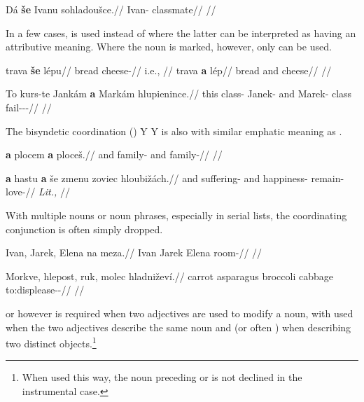 \pex
\begingl
    \gla Dá \textbf{še} Ivanu sohladoušce.//
    \glb {} \Com{} Ivan-\Ins{} classmate//
    \glft {}//
\endgl
\xe

In a few cases,  is used instead of  where the latter can be interpreted as having an attributive meaning. Where the noun is marked, however, only  can be used.

\begin{multicols}{2}
\pex\a
\begingl
    \gla trava \textbf{še} lépu//
    \glb bread \Com{} cheese-\Ins{}//
    \glft {} i.e., //
\endgl
\a
\begingl
    \gla trava \textbf{a} lép//
    \glb bread and cheese//
    \glft {}//
\endgl
\xe\end{multicols}

\pex
\begingl
    \gla To kurs-te Jankám \textbf{a} Markám hlupienince.//
    \glb this class-\Foc{} Janek-\Agt{} and Marek-\Agt{} class fail-\Pv{}-\Pf{}-\Quot{}//
    \glft {}//
\endgl
\xe


The bisyndetic coordination (\cite{velupillai2012})  Y  Y is also with similar emphatic meaning as .

\pex
\begingl
    \gla \textbf{a} plocem \textbf{a} ploceš.//
    \glb and family-\First{}\Sg{} and family-//
    \glft {}//
\endgl
\xe

\pex
\begingl
    \gla \textbf{a} hastu \textbf{a} še zmenu zoviec hloubižách.//
    \glb and suffering-\mk{} and \Com{} happiness-\Ins{} remain-\Cv{} love-//
    \glft {} \emph{Lit.,} //
\endgl
\xe

With multiple nouns or noun phrases, especially in serial lists, the coordinating conjunction is often simply dropped.

\pex
\begingl
    \gla Ivan, Jarek, Elena na meza.//
    \glb Ivan Jarek Elena \Loc{} room-\Pat{}//
    \glft {}//
\endgl
\xe

\pex
\begingl
    \gla Morkve, hlepost, ruk, molec hladniževí.//
    \glb carrot asparagus broccoli cabbage to:displease-\Av{}-\Cont{}//
    \glft {}//
\endgl
\xe

 or  however is required when two adjectives are used to modify a noun, with  used when the two adjectives describe the same noun and  (or often ) when describing two distinct objects.\footnote{When used this way, the noun preceding  or  is not declined in the instrumental case.}

